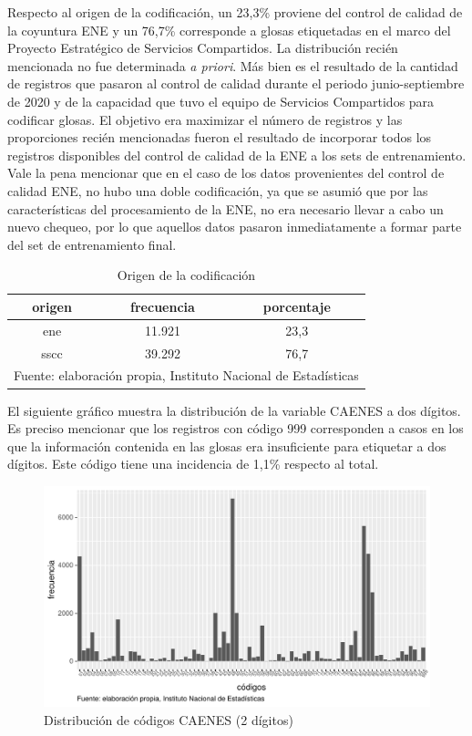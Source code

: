 \documentclass[
  12pt,
  spanish,
]{article}
\begin{document}
Respecto al origen de la codificación, un 23,3\% proviene del control de
calidad de la coyuntura ENE y un 76,7\% corresponde a glosas etiquetadas
en el marco del Proyecto Estratégico de Servicios Compartidos. La
distribución recién mencionada no fue determinada \emph{a priori}. Más
bien es el resultado de la cantidad de registros que pasaron al control
de calidad durante el periodo junio-septiembre de 2020 y de la capacidad
que tuvo el equipo de Servicios Compartidos para codificar glosas. El
objetivo era maximizar el número de registros y las proporciones recién
mencionadas fueron el resultado de incorporar todos los registros
disponibles del control de calidad de la ENE a los sets de
entrenamiento. Vale la pena mencionar que en el caso de los datos
provenientes del control de calidad ENE, no hubo una doble codificación,
ya que se asumió que por las características del procesamiento de la
ENE, no era necesario llevar a cabo un nuevo chequeo, por lo que
aquellos datos pasaron inmediatamente a formar parte del set de
entrenamiento final.

\begin{table}[H]

\caption{\label{tab:plotear tabla origen}\label{origen_cod}Origen de la codificación}
\centering
\fontsize{9.5}{11.5}\selectfont
\begin{tabular}[t]{ccc}
\toprule
origen & frecuencia & porcentaje\\
\midrule
ene & 11.921 & 23,3\\
sscc & 39.292 & 76,7\\
\bottomrule
\multicolumn{3}{l}{\rule{0pt}{1em}Fuente: elaboración propia, Instituto Nacional de Estadísticas }\\
\end{tabular}
\end{table}

El siguiente gráfico muestra la distribución de la variable CAENES a dos
dígitos. Es preciso mencionar que los registros con código 999
corresponden a casos en los que la información contenida en las glosas
era insuficiente para etiquetar a dos dígitos. Este código tiene una
incidencia de 1,1\% respecto al total.

\begin{figure}[H]
\centering
\large
\caption{Distribución de códigos CAENES (2 dígitos)}
\label{caenes_distancia}
\includegraphics[width = \linewidth]{imagenes/distribucion_caenes.pdf}
\normalsize
\end{figure}
\end{document}
